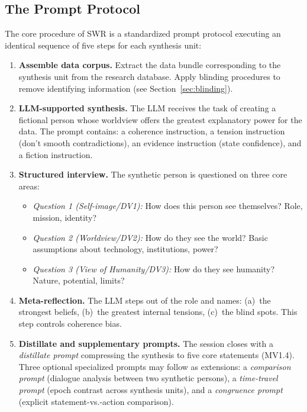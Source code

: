 \documentclass[11pt,a4paper]{article}
\theoremstyle{definition}
\theoremstyle{plain}
\theoremstyle{remark}
\begin{document}
\subsection{The Prompt Protocol}
\label{sec:prompt_protocol}

The core procedure of SWR is a standardized prompt protocol executing an identical sequence of five steps for each synthesis unit:

\begin{enumerate}[leftmargin=*]
  \item \textbf{Assemble data corpus.} Extract the data bundle corresponding to the synthesis unit from the research database. Apply blinding procedures to remove identifying information (see Section~\ref{sec:blinding}).

  \item \textbf{LLM-supported synthesis.} The LLM receives the task of creating a fictional person whose worldview offers the greatest explanatory power for the data. The prompt contains: a coherence instruction, a tension instruction (don't smooth contradictions), an evidence instruction (state confidence), and a fiction instruction.

  \item \textbf{Structured interview.} The synthetic person is questioned on three core areas:
  \begin{itemize}[leftmargin=*]
    \item \emph{Question 1 (Self-image/DV1):} How does this person see themselves? Role, mission, identity?
    \item \emph{Question 2 (Worldview/DV2):} How do they see the world? Basic assumptions about technology, institutions, power?
    \item \emph{Question 3 (View of Humanity/DV3):} How do they see humanity? Nature, potential, limits?
  \end{itemize}

  \item \textbf{Meta-reflection.} The LLM steps out of the role and names: (a)~the strongest beliefs, (b)~the greatest internal tensions, (c)~the blind spots. This step controls coherence bias.

  \item \textbf{Distillate and supplementary prompts.} The session closes with a \emph{distillate prompt} compressing the synthesis to five core statements (MV1.4). Three optional specialized prompts may follow as extensions: a \emph{comparison prompt} (dialogue analysis between two synthetic persons), a \emph{time-travel prompt} (epoch contrast across synthesis units), and a \emph{congruence prompt} (explicit statement-vs.-action comparison).
\end{enumerate}
\end{document}
